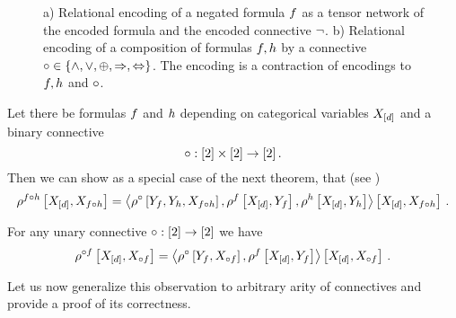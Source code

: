 \begin{figure}[h]
\begin{center}
	
\end{center}
\caption{a) Relational encoding of a negated formula $f$ as a tensor network of the encoded formula and the encoded connective $\lnot$.
	b) Relational encoding of a composition of formulas $f, h$ by a connective $\circ\in\{\land,\lor,\oplus,\Rightarrow,\Leftrightarrow\}$. 
	The encoding is a contraction of encodings to  $f, h$ and $\circ$.}
	\label{fig:unaryBinaryComposition} 
\end{figure}

Let there be formulas $f$ and $h$ depending on categorical variables $X_{[d]}$ and a binary connective
	\[ \circ: [2]\times[2] \rightarrow[2] \, . \]
Then we can show as a special case of the next theorem, that (see )
\begin{align*}
	\rho^{f\circ h}\left[X_{[d]},X_{f\circ h}\right]
	= \left\langle 
	\rho^{\circ}\left[Y_{f},Y_{h},X_{f\circ h}\right],
	\rho^{f}\left[X_{[d]},Y_{f}\right],
	\rho^{h}\left[X_{[d]},Y_{h}\right] 
	\right\rangle \left[ 
	X_{[d]},X_{f\circ h}
	 \right] \, . 
\end{align*}

For any unary connective $\circ: [2] \rightarrow[2]$ we have
\begin{align*}
	\rho^{\circ f}\left[X_{[d]},X_{\circ f}\right]
	= \left\langle 
	\rho^{\circ}\left[Y_{f},X_{\circ f}\right],
	\rho^{f}\left[X_{[d]},Y_{f}\right]
	\right\rangle \left[ 
	X_{[d]},X_{\circ f} \right] \, . 
\end{align*}

Let us now generalize this observation to arbitrary arity of connectives and provide a proof of its correctness.

